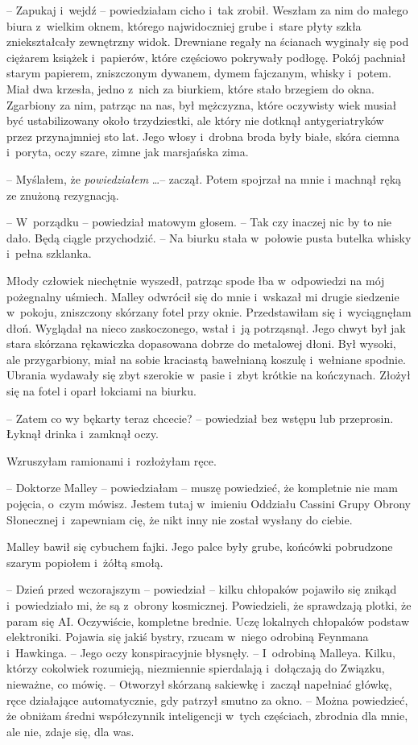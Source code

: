 \documentclass[oneside,polish,11pt,sfheadings]{mwbk}
\begin{document}
-- Zapukaj i~wejdź -- powiedziałam cicho i~tak zrobił. Weszłam za nim do
małego biura z~wielkim oknem, którego najwidoczniej grube i~stare płyty
szkła zniekształcały zewnętrzny widok. Drewniane regały na ścianach
wyginały się pod ciężarem książek i~papierów, które częściowo pokrywały
podłogę. Pokój pachniał starym papierem, zniszczonym dywanem, dymem
fajczanym, whisky i~potem. Miał dwa krzesła, jedno z~nich za biurkiem,
które stało brzegiem do okna. Zgarbiony za nim, patrząc na nas, był
mężczyzna, które oczywisty wiek musiał być ustabilizowany około
trzydziestki, ale który nie dotknął antygeriatryków przez przynajmniej
sto lat. Jego włosy i~drobna broda były białe, skóra ciemna i~poryta,
oczy szare, zimne jak marsjańska zima.

-- Myślałem, że \textit{powiedziałem }\ldots  -- zaczął. Potem spojrzał na mnie
i machnął ręką ze znużoną rezygnacją. 

-- W~porządku -- powiedział matowym
głosem. -- Tak czy inaczej nic by to nie dało. Będą ciągle przychodzić. -- Na biurku stała w~połowie pusta butelka whisky i~pełna szklanka.

Młody człowiek niechętnie wyszedł, patrząc spode łba w~odpowiedzi na mój
pożegnalny uśmiech. Malley odwrócił się do mnie i~wskazał mi drugie
siedzenie w~pokoju, zniszczony skórzany fotel przy oknie. Przedstawiłam
się i~wyciągnęłam dłoń. Wyglądał na nieco zaskoczonego, wstał i~ją
potrząsnął. Jego chwyt był jak stara skórzana rękawiczka dopasowana
dobrze do metalowej dłoni. Był wysoki, ale przygarbiony, miał na sobie
kraciastą bawełnianą koszulę i~wełniane spodnie. Ubrania wydawały się
zbyt szerokie w~pasie i~zbyt krótkie na kończynach. Złożył się na fotel
i oparł łokciami na biurku.

-- Zatem co wy bękarty teraz chcecie? -- powiedział bez wstępu lub
przeprosin. Łyknął drinka i~zamknął oczy.

Wzruszyłam ramionami i~rozłożyłam ręce. 

-- Doktorze Malley -- powiedziałam
-- muszę powiedzieć, że kompletnie nie mam pojęcia, o~czym mówisz. Jestem
tutaj w~imieniu Oddziału Cassini Grupy Obrony Słonecznej i~zapewniam
cię, że nikt inny nie został wysłany do ciebie.

Malley bawił się cybuchem fajki. Jego palce były grube, końcówki
pobrudzone szarym popiołem i~żółtą smołą.

-- Dzień przed wczorajszym -- powiedział -- kilku chłopaków pojawiło się
znikąd i~powiedziało mi, że są z~obrony kosmicznej. Powiedzieli, że
sprawdzają plotki, że param się AI. Oczywiście, kompletne brednie. Uczę
lokalnych chłopaków podstaw elektroniki. Pojawia się jakiś bystry,
rzucam w~niego odrobiną Feynmana i~Hawkinga. -- Jego oczy konspiracyjnie
błysnęły. -- I~odrobiną Malleya. Kilku, którzy cokolwiek rozumieją,
niezmiennie spierdalają i~dołączają do Związku, nieważne, co mówię. -- Otworzył skórzaną sakiewkę i~zaczął napełniać główkę, ręce działające
automatycznie, gdy patrzył smutno za okno. -- Można powiedzieć, że
obniżam średni współczynnik inteligencji w~tych częściach, zbrodnia dla
mnie, ale nie, zdaje się, dla was.
\end{document}
